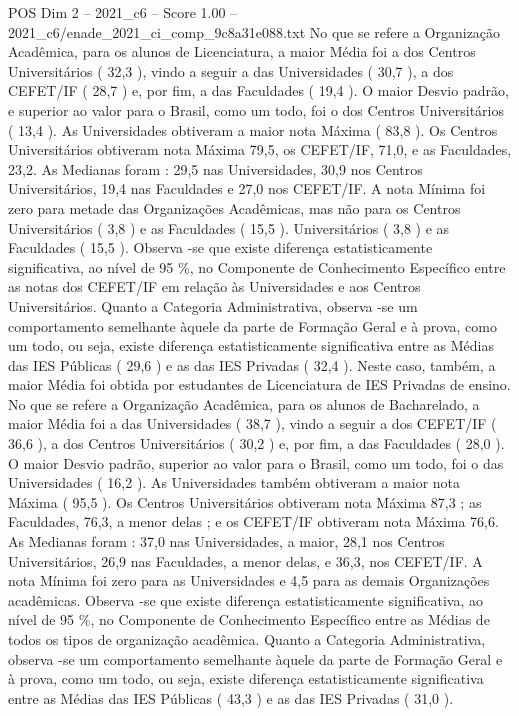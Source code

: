 \begin{textsample}{POS Dim 2 – 2021\_c6 – Score 1.00 – 2021\_c6/enade\_2021\_ci\_comp\_9c8a31e088.txt}
No que se refere a Organização Acadêmica, para os alunos de Licenciatura, a maior Média foi a dos Centros Universitários ( 32,3 ), vindo a seguir a das Universidades ( 30,7 ), a dos CEFET/IF ( 28,7 ) e, por fim, a das Faculdades ( 19,4 ).
O maior Desvio padrão, e superior ao valor para o Brasil, como um todo, foi o dos Centros Universitários ( 13,4 ).
As Universidades obtiveram a maior nota Máxima ( 83,8 ).
Os Centros Universitários obtiveram nota Máxima 79,5, os CEFET/IF, 71,0, e as Faculdades, 23,2.
As Medianas foram : 29,5 nas Universidades, 30,9 nos Centros Universitários, 19,4 nas Faculdades e 27,0 nos CEFET/IF.
A nota Mínima foi zero para metade das Organizações Acadêmicas, mas não para os Centros Universitários ( 3,8 ) e as Faculdades ( 15,5 ).
Universitários ( 3,8 ) e as Faculdades ( 15,5 ).
Observa -se que existe diferença estatisticamente significativa, ao nível de 95 \%, no Componente de Conhecimento Específico entre as notas dos CEFET/IF em relação às Universidades e aos Centros Universitários.
Quanto a Categoria Administrativa, observa -se um comportamento semelhante àquele da parte de Formação Geral e à prova, como um todo, ou seja, existe diferença estatisticamente significativa entre as Médias das IES Públicas ( 29,6 ) e as das IES Privadas ( 32,4 ).
Neste caso, também, a maior Média foi obtida por estudantes de Licenciatura de IES Privadas de ensino.
No que se refere a Organização Acadêmica, para os alunos de Bacharelado, a maior Média foi a das Universidades ( 38,7 ), vindo a seguir a dos CEFET/IF ( 36,6 ), a dos Centros Universitários ( 30,2 ) e, por fim, a das Faculdades ( 28,0 ).
O maior Desvio padrão, superior ao valor para o Brasil, como um todo, foi o das Universidades ( 16,2 ).
As Universidades também obtiveram a maior nota Máxima ( 95,5 ).
Os Centros Universitários obtiveram nota Máxima 87,3 ; as Faculdades, 76,3, a menor delas ; e os CEFET/IF obtiveram nota Máxima 76,6.
As Medianas foram : 37,0 nas Universidades, a maior, 28,1 nos Centros Universitários, 26,9 nas Faculdades, a menor delas, e 36,3, nos CEFET/IF.
A nota Mínima foi zero para as Universidades e 4,5 para as demais Organizações acadêmicas.
Observa -se que existe diferença estatisticamente significativa, ao nível de 95 \%, no Componente de Conhecimento Específico entre as Médias de todos os tipos de organização acadêmica.
Quanto a Categoria Administrativa, observa -se um comportamento semelhante àquele da parte de Formação Geral e à prova, como um todo, ou seja, existe diferença estatisticamente significativa entre as Médias das IES Públicas ( 43,3 ) e as das IES Privadas ( 31,0 ).

\end{textsample}
